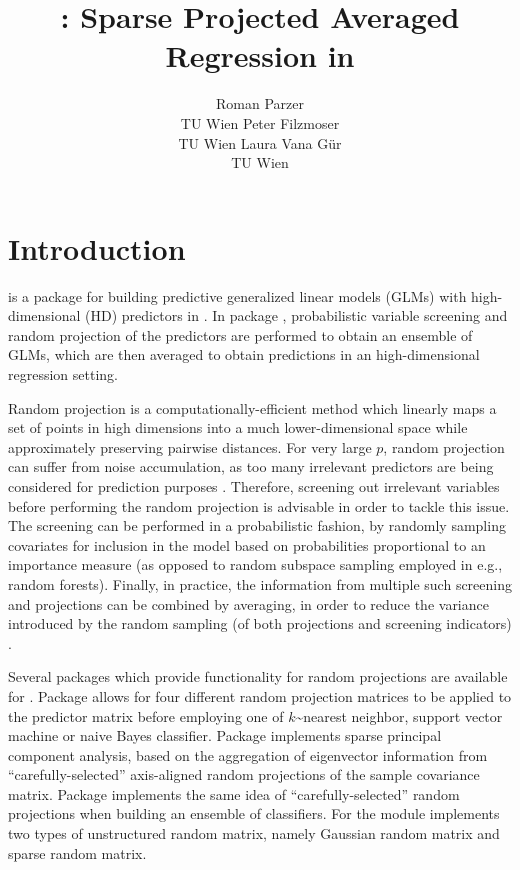 \documentclass[
  article]{jss}
\author{Roman Parzer\\TU Wien \And Peter Filzmoser\\TU Wien \AND Laura
Vana Gür\\TU Wien}
\title{\pkg{SPAR}: Sparse Projected Averaged Regression in \proglang{R}}
\begin{document}
\maketitle


\section{Introduction}\label{sec-intro}

 is a package for building predictive generalized linear
models (GLMs) with high-dimensional (HD) predictors in . In
package , probabilistic variable screening and random
projection of the predictors are performed to obtain an ensemble of
GLMs, which are then averaged to obtain predictions in an
high-dimensional regression setting.

Random projection is a computationally-efficient method which linearly
maps a set of points in high dimensions into a much lower-dimensional
space while approximately preserving pairwise distances. For very large
\(p\), random projection can suffer from noise accumulation, as too many
irrelevant predictors are being considered for prediction purposes
\citep{Dunson2020TargRandProj}. Therefore, screening out irrelevant
variables before performing the random projection is advisable in order
to tackle this issue. The screening can be performed in a probabilistic
fashion, by randomly sampling covariates for inclusion in the model
based on probabilities proportional to an importance measure (as opposed
to random subspace sampling employed in e.g., random forests). Finally,
in practice, the information from multiple such screening and
projections can be combined by averaging, in order to reduce the
variance introduced by the random sampling (of both projections and
screening indicators) \citep{Thanei2017RPforHDR}.

Several packages which provide functionality for random projections are
available for . Package 
\citep{RandProR, SIDDHARTH2020100629} allows for four different random
projection matrices to be applied to the predictor matrix before
employing one of \(k\)\textasciitilde nearest neighbor, support vector
machine or naive Bayes classifier. Package 
\citep{SPCAvRPR} implements sparse principal component analysis, based
on the aggregation of eigenvector information from
``carefully-selected'' axis-aligned random projections of the sample
covariance matrix. Package  \citep{RPEnsembleR}
implements the same idea of ``carefully-selected'' random projections
when building an ensemble of classifiers. For 
\citet{Python} the  module implements
two types of unstructured random matrix, namely Gaussian random matrix
and sparse random matrix.
\end{document}
